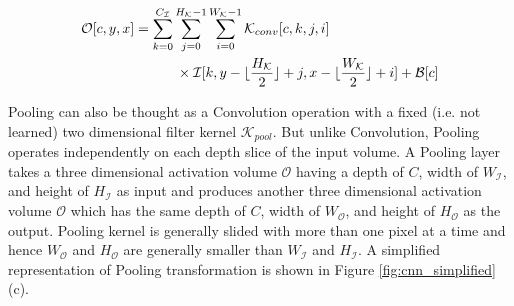 \begin{equation}
\label{eqn:conv_operator}
\begin{split}
\mathcal{O}[c,y,x] &= \sum_{k=0}^{C_{\mathcal{I}}} \sum_{j=0}^{H_\mathcal{K}-1} \sum_{i=0}^{W_\mathcal{K}-1} \mathcal{K}_{conv}[c, k, j, i] \\ & \quad \quad \quad \times \mathcal{I}[k,y-\lfloor\frac{H_\mathcal{K}}{2}\rfloor+j,x-\lfloor\frac{W_\mathcal{K}}{2}\rfloor+i] + \mathcal{B}[c]
\end{split}
\end{equation}

Pooling can also be thought as a Convolution operation with a fixed (i.e. not learned) two dimensional filter kernel $\mathcal{K}_{pool}$.
But unlike Convolution, Pooling operates independently on each depth slice of the input volume.
A Pooling layer takes a three dimensional activation volume $\mathcal{O}$ having a depth of $C$, width of $W_{\mathcal{I}}$, and height of $H_{\mathcal{I}}$ as input and produces another three dimensional activation volume $\mathcal{O}$ which has the same depth of $C$, width of $W_{\mathcal{O}}$, and height of $H_{\mathcal{O}}$ as the output.
Pooling kernel is generally slided with more than one pixel at a time and hence $W_{\mathcal{O}}$ and $H_{\mathcal{O}}$ are generally smaller than $W_{\mathcal{I}}$ and $H_{\mathcal{I}}$.
A simplified representation of Pooling transformation is shown in Figure \ref{fig:cnn_simplified} (c).




